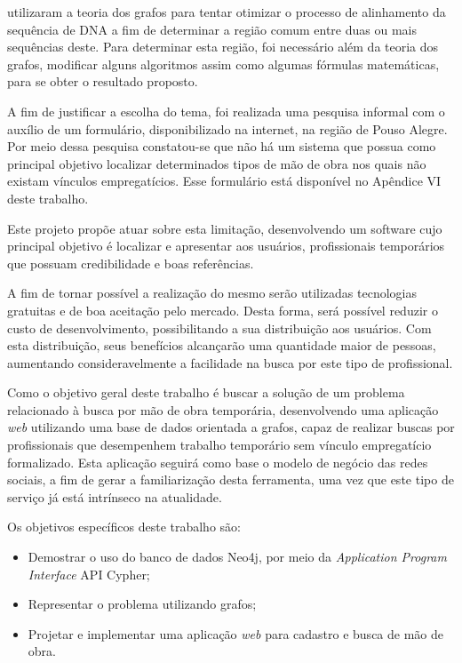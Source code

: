 \par {} utilizaram a teoria dos grafos para tentar otimizar o processo de alinhamento da sequência de DNA a fim de determinar a região comum entre duas ou mais sequências deste. Para determinar esta região, foi necessário além da teoria dos grafos, modificar alguns algoritmos assim como algumas fórmulas matemáticas, para se obter o resultado proposto.

\par A fim de justificar a escolha do tema, foi realizada uma pesquisa informal com o auxílio de um formulário, disponibilizado na internet, na região de Pouso Alegre. Por meio dessa pesquisa constatou-se que não há um sistema que possua como principal objetivo localizar determinados tipos de mão de obra nos quais não existam vínculos empregatícios. Esse formulário está disponível no Apêndice VI deste trabalho.

\par Este projeto propõe atuar sobre esta limitação, desenvolvendo um software cujo principal objetivo é localizar e apresentar aos usuários, profissionais temporários que possuam credibilidade e boas referências.

\par A fim de tornar possível a realização do mesmo serão utilizadas tecnologias gratuitas e de boa aceitação pelo mercado. Desta forma, será possível reduzir o custo de desenvolvimento, possibilitando a sua distribuição aos usuários. Com esta distribuição, seus benefícios alcançarão uma quantidade maior de pessoas, aumentando consideravelmente a facilidade na busca por este tipo de profissional.

\par Como o objetivo geral deste trabalho é buscar a solução de um problema relacionado à busca por mão de obra temporária, desenvolvendo uma aplicação \textit{web} utilizando uma base de dados orientada a grafos, capaz de realizar buscas por profissionais que desempenhem trabalho temporário sem vínculo empregatício formalizado. Esta aplicação seguirá como base o modelo de negócio das redes sociais, a fim de gerar a familiarização desta ferramenta, uma vez que este tipo de serviço já está intrínseco na atualidade.

\par Os objetivos específicos deste trabalho são:

\begin{itemize}
	\item Demostrar o uso do banco de dados Neo4j, por meio da \textit{Application Program Interface} API Cypher;
	\item Representar o problema utilizando grafos;
	\item Projetar e implementar uma aplicação \textit{web} para cadastro e busca de mão de obra.
\end{itemize}

